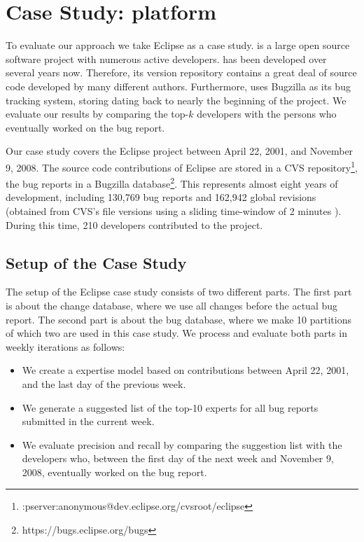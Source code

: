 \section{Case Study: \EC platform}\label{sec:casestudy}

To evaluate our approach we take Eclipse as a case study. \EC is a large open source software project with numerous active developers.
\EC has been developed over several years now. Therefore, its version repository contains a great deal of source code developed by many different authors.
Furthermore, \EC uses Bugzilla as its bug tracking system, storing \BRs dating back to nearly the beginning of the project.
We evaluate our results by comparing the top-$k$ developers with the persons who eventually worked on the bug report.

Our case study covers the Eclipse project between April 22, 2001, and November 9, 2008. The source code contributions of Eclipse are stored in a CVS repository\footnote{:pserver:anonymous@dev.eclipse.org/cvsroot/eclipse}, the bug reports in a Bugzilla database\footnote{https://bugs.eclipse.org/bugs}. This represents almost eight years of development, including 130,769 bug reports and 162,942 global revisions (obtained from CVS's file versions using a sliding time-window of 2 minutes \cite{Zimm04a}). During this time, 210 developers contributed to the project.

\subsection{Setup of the Case Study}

The setup of the Eclipse case study consists of two different parts. The first part is about the change database, where we use all changes before the actual bug report. The second part is about the bug database, where we make 10 partitions of which two are used in this case study. We process and evaluate  both parts in weekly iterations as follows:
\begin{itemize}
\item We create a \DEVLECT expertise model based on contributions between April 22, 2001, and the last day of the previous week.
\item We generate a suggested list of the top-10 experts for all bug reports submitted in the current week.
\item We evaluate precision and recall by comparing the suggestion list with the developers who, between the first day of the next week and November 9, 2008, eventually worked on the bug report.
\end{itemize}

